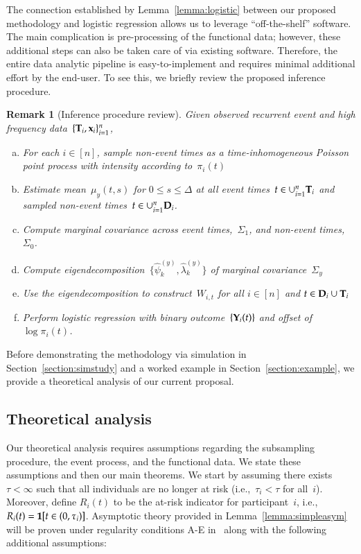 \documentclass[12pt]{amsart}
\newtheorem{rmk}[thm]{Remark}%
\def\Y{{\bf Y}}
\def\bfx{{\bf x}}
\def\bfT{{\bf T}}
\def\bfD{{\bf D}}
\begin{document}
The connection established by Lemma~\ref{lemma:logistic} between our proposed methodology and logistic regression allows us to leverage ``off-the-shelf'' software.  The main complication is pre-processing of the functional data; however, these additional steps can also be taken care of via existing software.  Therefore, the entire data analytic pipeline is easy-to-implement and requires minimal additional effort by the end-user. To see this, we briefly review the proposed inference procedure.

\begin{rmk}[Inference procedure review] \normalfont
\label{rmk:review}
Given observed recurrent event and high frequency data~$\{ \bfT_i, \bfx_i \}_{i=1}^n$,
\begin{enumerate}[(a)]
\item For each $i \in [n]$, sample non-event times as a time-inhomogeneous Poisson point process with intensity according to~$\pi_i (t)$
\item \label{p2} Estimate mean~$\mu_y (t,s)$ for $0 \leq s \leq \Delta$ at all event times~$t \in \cup_{i=1}^n \bfT_i$ and sampled non-event times~$t \in \cup_{i=1}^n \bfD_i$.
\item \label{p3} Compute marginal covariance across event times,~$\Sigma_1$, and non-event times,~$\Sigma_0$.
\item \label{p4} Compute eigendecomposition~$\{ \hat \psi_k^{(y)}, \hat \lambda_k^{(y)} \}$ of marginal covariance~$\Sigma_y$
\item Use the eigendecomposition to construct~$W_{i,t}$ for all $i \in [n]$ and $t \in \bfD_i \cup \bfT_i$
\item \label{point:log} Perform logistic regression with binary outcome~$\{ \Y_i (t) \}$  and offset of~$\log \pi_i (t)$.
\end{enumerate}
\end{rmk}

\noindent Before demonstrating the methodology via simulation in Section~\ref{section:simstudy} and a worked example in Section~\ref{section:example}, we provide a theoretical analysis of our current proposal.


\subsection{Theoretical analysis}
\label{section:theory}

Our theoretical analysis requires assumptions regarding the subsampling procedure, the event process, and the functional data. We state these assumptions and then our main theorems. We start by assuming there exists~$\tau < \infty$ such that all individuals are no longer at risk (i.e.,~$\tau_i < \tau$ for all~$i$). Moreover, define $R_i (t)$ to be the at-risk indicator for participant~$i$, i.e., $R_i (t) = {\bf 1} [t \in (0,\tau_i)]$. Asymptotic theory provided in Lemma~\ref{lemma:simpleasym} will be proven under regularity conditions A-E in~\cite[pp. 420--421]{Andersen1993} along with the following additional assumptions:
\end{document}
